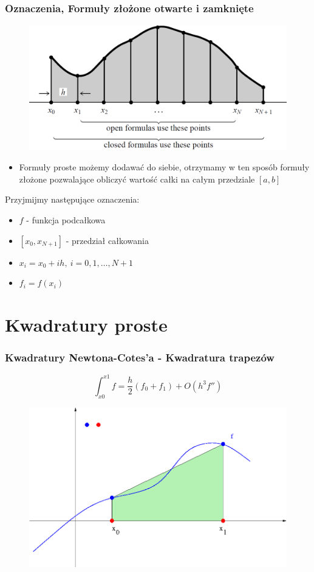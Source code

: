 \documentclass[compress,red]{beamer}
\begin{document}
	\begin{frame}
		\frametitle{Oznaczenia, Formuły złożone otwarte i zamknięte}
		\begin{figure}
			\includegraphics[scale=0.2]{./img/points}
		\end{figure}
		 {
			\begin{itemize}
				\item
					Formuły proste możemy dodawać do siebie, otrzymamy w ten 
					sposób formuły złożone pozwalające obliczyć wartość całki na
					całym przedziale $[a, b]$
			\end{itemize}
		}
		\only<2> {
			Przyjmijmy następujące oznaczenia:
			\begin{itemize}
				\item $f$ - funkcja podcałkowa
				\item $[x_0, x_{N+1}]$ - przedział całkowania
				\item $ x_i = x_0 + ih, \ i = 0, 1, \ldots, N+1 $
				\item $ f_i = f(x_i) $
			\end{itemize}
		}
	\end{frame}
	
\section{Kwadratury proste}
	
	\begin{frame}
		\frametitle{Kwadratury Newtona-Cotes'a - Kwadratura trapezów}
		\[ \int_{x0}^{x1} f = \frac{h}{2}(f_0 + f_1) + O(h^3 f'') \]
		\begin{figure}
			\includegraphics[scale=0.3]{./img/q_trap}
		\end{figure} 
	\end{frame}	
	
\end{document}
